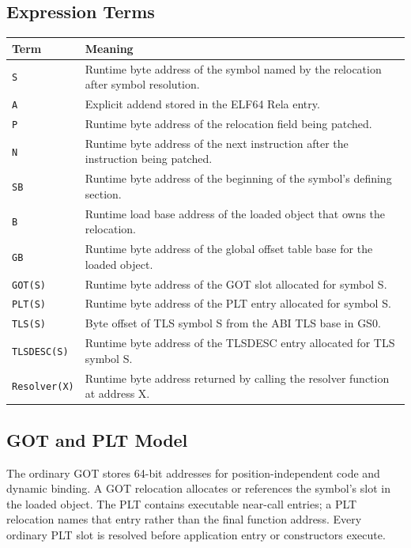 \documentclass[10pt,twoside]{article}
\begin{document}
\subsection{Expression Terms}
\begingroup\footnotesize
\setlength{\tabcolsep}{2pt}
\begin{longtable}{@{}p{1.0in}p{4.5in}@{}}
\toprule
\textbf{Term} & \textbf{Meaning}\\
\midrule
\endhead
\texttt{S} & Runtime byte address of the symbol named by the relocation after symbol resolution.\\
\texttt{A} & Explicit addend stored in the ELF64 Rela entry.\\
\texttt{P} & Runtime byte address of the relocation field being patched.\\
\texttt{N} & Runtime byte address of the next instruction after the instruction being patched.\\
\texttt{SB} & Runtime byte address of the beginning of the symbol's defining section.\\
\texttt{B} & Runtime load base address of the loaded object that owns the relocation.\\
\texttt{GB} & Runtime byte address of the global offset table base for the loaded object.\\
\texttt{GOT(S)} & Runtime byte address of the GOT slot allocated for symbol S.\\
\texttt{PLT(S)} & Runtime byte address of the PLT entry allocated for symbol S.\\
\texttt{TLS(S)} & Byte offset of TLS symbol S from the ABI TLS base in GS0.\\
\texttt{TLSDESC(S)} & Runtime byte address of the TLSDESC entry allocated for TLS symbol S.\\
\texttt{Resolver(X)} & Runtime byte address returned by calling the resolver function at address X.\\
\bottomrule
\end{longtable}
\endgroup
\subsection{GOT and PLT Model}
The ordinary GOT stores 64-bit addresses for position-independent code and
dynamic binding. A GOT relocation allocates or references the symbol's slot in
the loaded object. The PLT contains executable near-call entries; a PLT
relocation names that entry rather than the final function address. Every
ordinary PLT slot is resolved before application entry or constructors execute.
\end{document}
